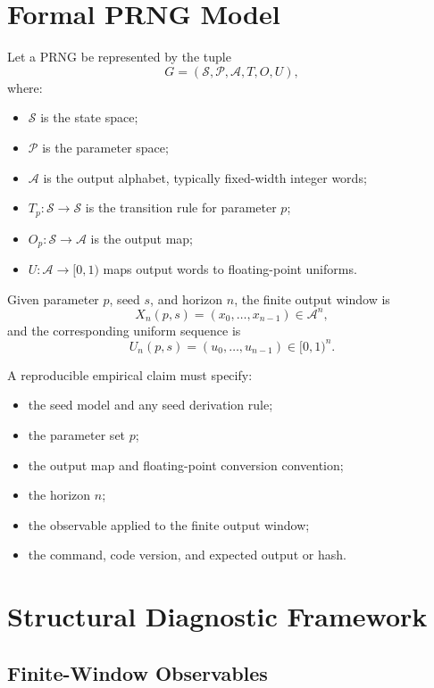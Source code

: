 \documentclass[11pt,a4paper]{article}
\begin{document}
\section{Formal PRNG Model}

Let a PRNG be represented by the tuple
\[
G = (\mathcal{S}, \mathcal{P}, \mathcal{A}, T, O, U),
\]
where:

\begin{itemize}[nosep]
  \item $\mathcal{S}$ is the state space;
  \item $\mathcal{P}$ is the parameter space;
  \item $\mathcal{A}$ is the output alphabet, typically fixed-width integer words;
  \item $T_p : \mathcal{S}\to\mathcal{S}$ is the transition rule for parameter $p$;
  \item $O_p : \mathcal{S}\to\mathcal{A}$ is the output map;
  \item $U : \mathcal{A}\to[0,1)$ maps output words to floating-point uniforms.
\end{itemize}

Given parameter $p$, seed $s$, and horizon $n$, the finite output window is
\[
X_n(p,s) = (x_0,\ldots,x_{n-1}) \in \mathcal{A}^n,
\]
and the corresponding uniform sequence is
\[
U_n(p,s) = (u_0,\ldots,u_{n-1}) \in [0,1)^n.
\]

A reproducible empirical claim must specify:

\begin{itemize}[nosep]
  \item the seed model and any seed derivation rule;
  \item the parameter set $p$;
  \item the output map and floating-point conversion convention;
  \item the horizon $n$;
  \item the observable applied to the finite output window;
  \item the command, code version, and expected output or hash.
\end{itemize}

\section{Structural Diagnostic Framework}

\subsection{Finite-Window Observables}
\end{document}

